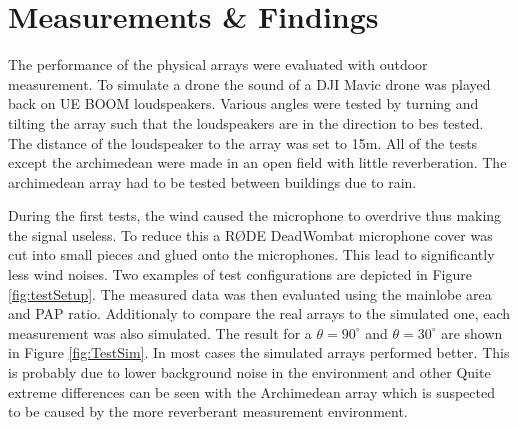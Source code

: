 \section{Measurements \& Findings} \label{sec:array_prototype_measurements}
The performance of the physical arrays were evaluated with outdoor measurement.
To simulate a drone the sound of a DJI Mavic drone  was played back on 
UE BOOM loudspeakers.
Various angles were tested by turning and tilting the array such that 
the loudspeakers are in the direction to bes tested.
The distance of the loudspeaker to the array was set to 
15m.
All of the tests except the archimedean were made in an open field with little reverberation.
The archimedean array had to be tested between buildings due to rain.

During the first tests, the wind caused the microphone to overdrive
thus making the signal useless.
To reduce this a RØDE DeadWombat microphone cover was cut into small pieces
and glued onto the microphones.
This lead to significantly less wind noises.
Two examples of test configurations are depicted in Figure \ref*{fig:testSetup}.
The measured data was then evaluated using the mainlobe area and PAP ratio. 
Additionaly to compare the real arrays to the simulated one, each measurement
was also simulated.
The result for a $\theta = 90^\circ$ and $\theta = 30^\circ$ are shown in 
Figure \ref*{fig:TestSim}.
In most cases the simulated arrays performed better.
This is probably due to lower background noise in the environment and other 
Quite extreme differences can be seen with the Archimedean array which is 
suspected to be caused by the more reverberant measurement environment.

